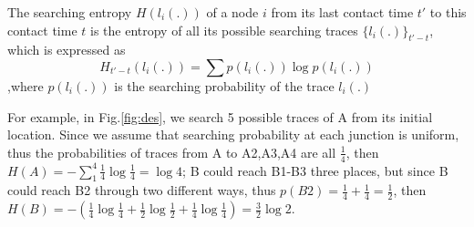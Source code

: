 



 \begin{definition}
 The searching entropy $H(l_i(.))$ of a node $i$ from its last contact time $t'$ to this contact time $t$ is the entropy of all its possible searching traces $\{l_i(.)\}_{t'-t}$, which is expressed as
 \begin{displaymath}
 H_{t'-t}(l_i(.))=\sum p(l_i(.)) \log p(l_i(.))
 \end{displaymath}
 ,where $p(l_i(.))$ is the searching probability of the trace $l_i(.)$
 \end{definition}

For example, in Fig.\ref{fig:des}, we search 5 possible traces of A from its initial location. Since we assume that searching probability at each junction is uniform, thus the probabilities of traces from A to A2,A3,A4 are all $\frac{1}{4}$, then $H(A)=-\sum_1^4 \frac{1}{4}\log\frac{1}{4}=\log 4$; B could reach B1-B3 three places, but since B could reach B2 through two different ways, thus $p(B2)=\frac{1}{4}+\frac{1}{4}=\frac{1}{2}$, then $H(B)=-(\frac{1}{4}\log\frac{1}{4}+\frac{1}{2}\log\frac{1}{2}+\frac{1}{4}\log\frac{1}{4})=\frac{3}{2} \log 2$.

